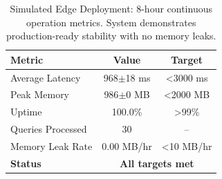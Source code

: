 
\begin{table}[t]
\centering
\caption{Simulated Edge Deployment: 8-hour continuous operation metrics.
System demonstrates production-ready stability with no memory leaks.}
\label{tab:deployment}
\begin{tabular}{l c c}
\toprule
\textbf{Metric} & \textbf{Value} & \textbf{Target} \\
\midrule
Average Latency & 968$\pm$18 ms & <3000 ms \\
Peak Memory & 986$\pm$0 MB & <2000 MB \\
Uptime & 100.0\% & >99\% \\
Queries Processed & 30 & -- \\
Memory Leak Rate & 0.00 MB/hr & <10 MB/hr \\
\midrule
\textbf{Status} & \multicolumn{2}{c}{\textbf{All targets met}} \\

\bottomrule
\end{tabular}
\end{table}
